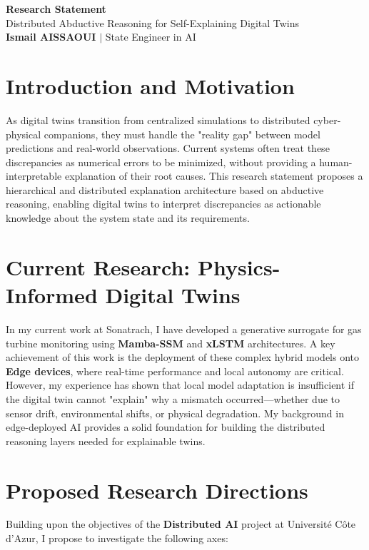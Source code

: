 \documentclass[a4paper,11pt]{article}
\begin{document}
\begin{center}
    {\LARGE\bfseries\color{titleblue} Research Statement}\\[6pt]
    {\large Distributed Abductive Reasoning for Self-Explaining Digital Twins}\\[4pt]
    \textbf{Ismail AISSAOUI} $|$ State Engineer in AI
\end{center}

\bigskip

\section{Introduction and Motivation}
As digital twins transition from centralized simulations to distributed cyber-physical companions, they must handle the "reality gap" between model predictions and real-world observations. Current systems often treat these discrepancies as numerical errors to be minimized, without providing a human-interpretable explanation of their root causes. This research statement proposes a hierarchical and distributed explanation architecture based on abductive reasoning, enabling digital twins to interpret discrepancies as actionable knowledge about the system state and its requirements.

\section{Current Research: Physics-Informed Digital Twins}
In my current work at Sonatrach, I have developed a generative surrogate for gas turbine monitoring using \textbf{Mamba-SSM} and \textbf{xLSTM} architectures. A key achievement of this work is the deployment of these complex hybrid models onto \textbf{Edge devices}, where real-time performance and local autonomy are critical. However, my experience has shown that local model adaptation is insufficient if the digital twin cannot "explain" why a mismatch occurred—whether due to sensor drift, environmental shifts, or physical degradation. My background in edge-deployed AI provides a solid foundation for building the distributed reasoning layers needed for explainable twins.

\section{Proposed Research Directions}
Building upon the objectives of the \textbf{Distributed AI} project at Université Côte d’Azur, I propose to investigate the following axes:
\end{document}
